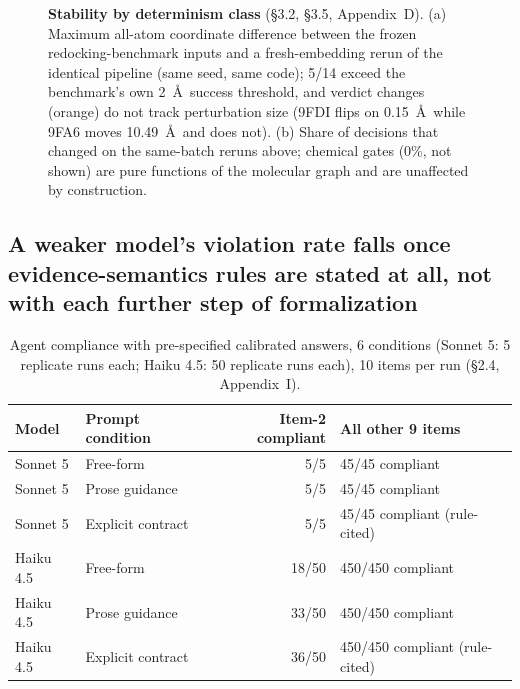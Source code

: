 \documentclass{article}
\begin{document}
\begin{figure}[t]
\begin{minipage}{0.42\linewidth}
\end{minipage}
\caption{\textbf{Stability by determinism class} (\S3.2, \S3.5, Appendix~D). (a) Maximum all-atom coordinate difference between the frozen redocking-benchmark inputs and a fresh-embedding rerun of the identical pipeline (same seed, same code); 5/14 exceed the benchmark's own 2~\AA\ success threshold, and verdict changes (orange) do not track perturbation size (9FDI flips on 0.15~\AA\ while 9FA6 moves 10.49~\AA\ and does not). (b) Share of decisions that changed on the same-batch reruns above; chemical gates (0\%, not shown) are pure functions of the molecular graph and are unaffected by construction.}
\label{fig:stability}
\end{figure}

\subsection{A weaker model's violation rate falls once evidence-semantics rules are stated at all, not with each further step of formalization}

\begin{table}[t]
  \caption{Agent compliance with pre-specified calibrated answers, 6 conditions (Sonnet 5: 5 replicate runs each; Haiku 4.5: 50 replicate runs each), 10 items per run (\S2.4, Appendix~I).}
  \label{tab:agent-probe}
  \centering
  \footnotesize
  \begin{tabular}{llrl}
    \toprule
    Model & Prompt condition & Item-2 compliant & All other 9 items \\
    \midrule
    Sonnet 5 & Free-form & 5/5 & 45/45 compliant \\
    Sonnet 5 & Prose guidance & 5/5 & 45/45 compliant \\
    Sonnet 5 & Explicit contract & 5/5 & 45/45 compliant (rule-cited) \\
    Haiku 4.5 & Free-form & 18/50 & 450/450 compliant \\
    Haiku 4.5 & Prose guidance & 33/50 & 450/450 compliant \\
    Haiku 4.5 & Explicit contract & 36/50 & 450/450 compliant (rule-cited) \\
    \bottomrule
  \end{tabular}
\end{table}
\end{document}
